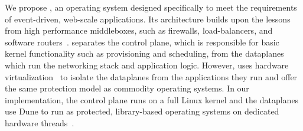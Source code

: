 


We propose \ix, an operating system designed specifically to meet the
requirements of event-driven, web-scale applications.  Its
architecture builds upon the lessons from high performance
middleboxes, such as firewalls, load-balancers, and software
routers~\cite{DBLP:journals/tocs/KohlerMCJK00,DBLP:conf/sosp/DobrescuEACFIKMR09}. \ix
separates the control plane, which is responsible for basic kernel
functionality such as provisioning and scheduling, from the dataplanes
which run the networking stack and application logic. However, \ix
uses hardware
virtualization~\cite{DBLP:journals/computer/UhligNRSMABKLS05} to
isolate the dataplanes from the applications they run and offer the
same protection model as commodity operating systems. In our
implementation, the control plane runs on a full Linux kernel and the
dataplanes use Dune to run \ix as protected, library-based operating
systems on dedicated hardware
threads~\cite{belay2012dune}. %


